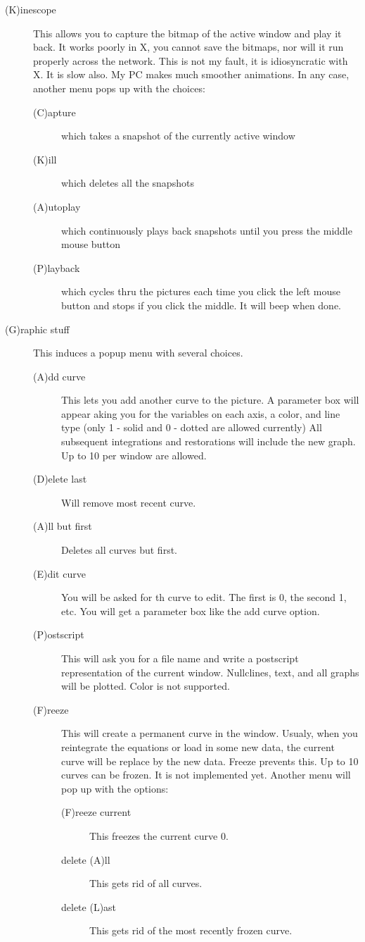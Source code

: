 \begin{description}
\item[(K)inescope]  This allows you to capture the bitmap of the active window and
 play it back.  It works poorly in X, you cannot save the bitmaps, nor will
 it run properly across the network.  This is not my fault, it is idiosyncratic
 with X.  It is slow also.  My PC makes much smoother animations. In any case, 
another menu pops up with the choices:
\begin{description}
\item[(C)apture] which takes a snapshot of the 
currently active window
\item[(K)ill] which deletes all the snapshots
\item[(A)utoplay] which 
continuously plays back snapshots until you press the middle mouse
button
\item[(P)layback] which cycles thru the pictures each time you click the left mouse 
button and stops if you click the middle.  It will beep when done.
\end{description}


\item[(G)raphic stuff]  This induces a popup menu with several
choices.
\begin{description}
\item[(A)dd curve]  This lets you add another curve to the picture. A 
parameter box will appear aking you for the variables on each axis, a color,
 and line type (only 1 - solid and 0 - dotted are allowed currently) All 
subsequent integrations and restorations will include the new graph.  Up to 
10 per window are allowed.
\item[(D)elete last]  Will remove most recent curve.
\item[(A)ll but first] Deletes all curves but first.
\item[(E)dit curve]  You will be asked for th curve to edit.  The first is 0,
 the second 1, etc.  You will get a parameter box like the add curve
option.
\item[(P)ostscript]  This will ask you for a file name and write a postscript
 representation of the current window.  Nullclines, text, and all graphs will be
 plotted.  Color is not supported.
\item[(F)reeze]  This will create a permanent curve in the window.  Usualy, 
when you reintegrate the equations or load in some new data, the current curve 
will be replace by the new data.  Freeze prevents this.  Up to 10 curves can be
 frozen.  It is not implemented yet. Another menu will pop up with the options:
\begin{description}
\item[(F)reeze current] This freezes the current curve 0.
\item[delete (A)ll]  This gets rid of all curves.
\item[delete (L)ast]  This gets rid of the most recently frozen curve.
\end{description}
\end{description}


\end{description}

